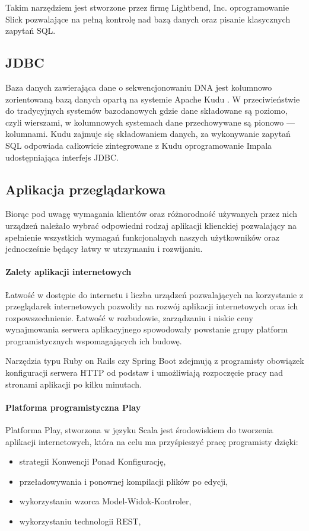 \documentclass[a4paper,12pt,twoside]{article}
\begin{document}
Takim narzędziem jest stworzone przez firmę Lightbend, Inc.
oprogramowanie Slick\cite{slick} pozwalające na pełną kontrolę nad bazą danych oraz pisanie klasycznych zapytań SQL.

\subsection{JDBC}
Baza danych zawierająca dane o sekwencjonowaniu DNA jest kolumnowo zorientowaną bazą danych opartą na systemie Apache Kudu \cite{kudu}. W przeciwieństwie do tradycyjnych systemów bazodanowych gdzie dane składowane są poziomo, czyli wierszami, w kolumnowych systemach dane przechowywane są pionowo — kolumnami.
Kudu zajmuje się składowaniem danych, za wykonywanie zapytań SQL
odpowiada całkowicie zintegrowane z Kudu oprogramowanie Impala \cite{impala} \cite{impalaArt} udostępniająca interfejs JDBC.

\subsection{Aplikacja przeglądarkowa}
Biorąc pod uwagę wymagania klientów oraz różnorodność używanych przez nich urządzeń należało wybrać odpowiedni rodzaj aplikacji klienckiej pozwalający na spełnienie wszystkich wymagań funkcjonalnych naszych użytkowników
oraz jednocześnie będący łatwy w utrzymaniu i rozwijaniu.

\paragraph{Zalety aplikacji internetowych}
Łatwość w dostępie do internetu i liczba urządzeń pozwalających na
korzystanie z przeglądarek internetowych pozwoliły
na rozwój aplikacji internetowych oraz ich rozpowszechnienie.
Łatwość w rozbudowie, zarządzaniu i
niskie ceny wynajmowania serwera aplikacyjnego spowodowały
powstanie grupy platform programistycznych wspomagających ich budowę.

Narzędzia typu Ruby on Rails czy Spring Boot
zdejmują z programisty obowiązek konfiguracji serwera
HTTP od podstaw i umożliwiają rozpoczęcie pracy
nad stronami aplikacji po kilku minutach.

\paragraph{Platforma programistyczna Play}
Platforma Play, stworzona w języku Scala jest środowiskiem
do tworzenia aplikacji internetowych,
która na celu ma przyśpieszyć pracę programisty dzięki:
\begin{itemize}
\item strategii Konwencji Ponad Konfigurację,
\item przeładowywania i ponownej kompilacji plików po edycji,
\item wykorzystaniu wzorca Model-Widok-Kontroler,
\item wykorzystaniu technologii REST,
\end{itemize}
\end{document}
